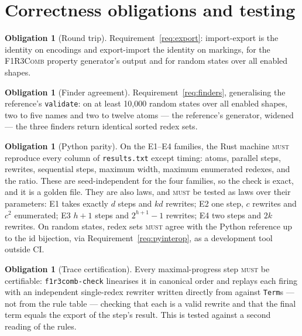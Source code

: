 \documentclass[11pt,a4paper]{article}
\newcommand{\code}[1]{\texttt{#1}}
\newcommand{\Comb}{\textsc{F1R3Comb}}
\newcommand{\MUST}{\textsc{must}}
\theoremstyle{definition}
\newtheorem{obligation}[definition]{Obligation}
\theoremstyle{plain}
\begin{document}
\section{Correctness obligations and testing}\label{sec:test}

\begin{obligation}[Round trip]\label{obl:roundtrip}
Requirement~\ref{req:export}: import-export is the identity on encodings and
export-import the identity on markings, for the \Comb{} property generator's
output and for random states over all enabled shapes.
\end{obligation}

\begin{obligation}[Finder agreement]\label{obl:finders}
Requirement~\ref{req:finders}, generalising the reference's
\code{validate}: on at least 10{,}000 random states over all enabled shapes,
two to five names and two to twelve atoms --- the reference's generator,
widened --- the three finders return identical sorted redex sets.
\end{obligation}

\begin{obligation}[Python parity]\label{obl:pyparity}
On the E1--E4 families, the Rust machine \MUST{} reproduce every column of
\code{results.txt} except timing: atoms, parallel steps, rewrites, sequential
steps, maximum width, maximum enumerated redexes, and the ratio. These are
seed-independent for the four families, so the check is exact, and it is a
golden file. They are also laws, and \MUST{} be tested as laws over their
parameters: E1 takes exactly $d$ steps and $kd$ rewrites; E2 one step, $c$
rewrites and $c^{2}$ enumerated; E3 $h+1$ steps and $2^{h+1}-1$ rewrites;
E4 two steps and $2k$ rewrites. On random states, redex sets \MUST{} agree
with the Python reference up to the id bijection, via
Requirement~\ref{req:pyinterop}, as a development tool outside CI.
\end{obligation}

\begin{obligation}[Trace certification]\label{obl:certify}
Every maximal-progress step \MUST{} be certifiable: \code{f1r3comb-check}
linearises it in canonical order and replays each firing with an independent
single-redex rewriter written directly from \cite[Def.~4.6]{combspec} against
\code{Term}s --- not from the rule table --- checking that each is a valid
rewrite and that the final term equals the export of the step's result. This
is \cite[Thm.~8.3]{matnote} tested against a second reading of the rules.
\end{obligation}
\end{document}

